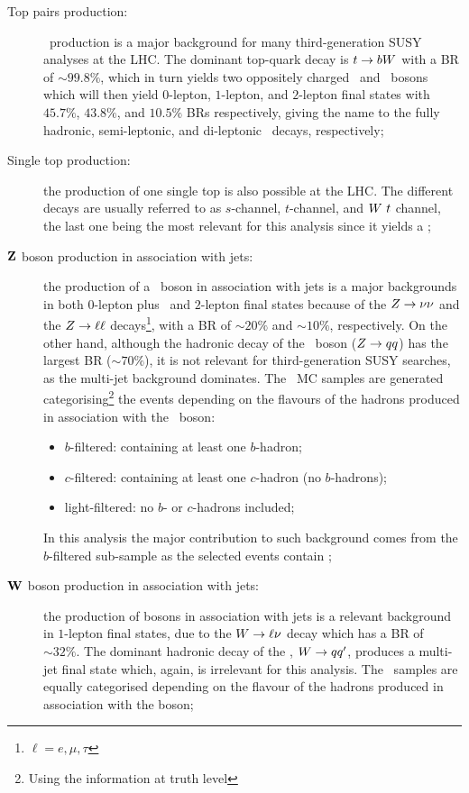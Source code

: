 		\begin{description}

			\item [Top pairs production:] \ttbar\ production is a major background for many third-generation \ac{SUSY} analyses at the LHC. The dominant top-quark decay is $t \rightarrow b W$ with a \ac{BR} of $\sim 99.8\%$, which in turn yields two oppositely charged \bjs\ and \Wboson\ bosons which will then yield $0$-lepton, $1$-lepton, and $2$-lepton final states with $45.7\%$, $43.8\%$, and $10.5\%$ \acp{BR} respectively, giving the name to the fully hadronic, semi-leptonic, and di-leptonic \ttbar\ decays, respectively; 
			
			\item [Single top production:] the production of one single top is also possible at the LHC. The different decays are usually referred to as $s$-channel, $t$-channel, and $W\ t$ channel, the last one being the most relevant for this analysis since it yields a \Wboson; 

			\item [$\mathbf{Z}$ boson production in association with jets:] the production of a \Zboson\ boson in association with jets is a major backgrounds in both $0$-lepton plus \met\ and $2$-lepton final states because of the $Z \rightarrow \nu \nu$ and the $Z \rightarrow \ell \ell$ decays\footnote{$\ell = e,\mu,\tau$}, with a \ac{BR} of $\sim 20\%$ and $\sim 10\%$, respectively. On the other hand, although the hadronic decay of the \Zboson\ boson ($Z \rightarrow qq$) has the largest \ac{BR} ($\sim 70\%$), it is not relevant for third-generation \ac{SUSY} searches, as the multi-jet background dominates. The \Zjets\ \ac{MC} samples are generated categorising\footnote{Using the information at truth level} the events depending on the flavours of the hadrons produced in association with the \Zboson\ boson:
			\begin{itemize}
				\item $b$-filtered: containing at least one $b$-hadron;
				\item $c$-filtered: containing at least one $c$-hadron (no $b$-hadrons);
				\item light-filtered: no $b$- or $c$-hadrons included;
			\end{itemize} 
			In this analysis the major contribution to such background comes from the $b$-filtered sub-sample as the selected events contain \bjs;

			\item [$\mathbf{W}$ boson production in association with jets:] the production of \Wboson bosons in association with jets is a relevant background in $1$-lepton final states, due to the $W \rightarrow \ell\nu$ decay which has a \ac{BR} of $\sim 32\%.$ The dominant hadronic decay of the \Wboson, $W \rightarrow qq'$, produces a multi-jet final state which, again, is irrelevant for this analysis. The \Wjets\ samples are equally categorised depending on the flavour of the hadrons produced in association with the \Wboson boson;


\end{description}
